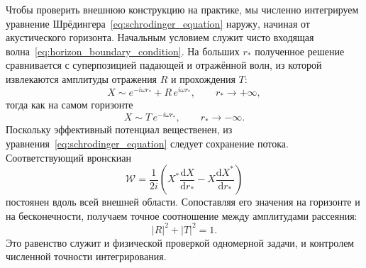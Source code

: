 \documentclass[12pt,a4paper,preprint,nopreprintline]{elsarticle}
\begin{document}
Чтобы проверить внешнюю конструкцию на практике, мы численно интегрируем уравнение Шрёдингера~\eqref{eq:schrodinger_equation} наружу, начиная от акустического горизонта. Начальным условием служит чисто входящая волна~\eqref{eq:horizon_boundary_condition}. На больших $r_{*}$ полученное решение сравнивается с суперпозицией падающей и отражённой волн, из которой извлекаются амплитуды отражения $R$ и прохождения $T$:
\begin{equation}
    X
    \sim
    e^{-i\omega r_{*}}
    +R\,e^{i\omega r_{*}},
    \qquad
    r_{*}\rightarrow+\infty,
    \label{eq:scattering_amplitudes}
\end{equation}
тогда как на самом горизонте
\begin{equation}
    X
    \sim
    T\,e^{-i\omega r_{*}},
    \qquad
    r_{*}\rightarrow-\infty.
    \label{eq:scattering_horizon_amplitude}
\end{equation}
Поскольку эффективный потенциал вещественен, из уравнения~\eqref{eq:schrodinger_equation} следует сохранение потока. Соответствующий вронскиан
\begin{equation}
    \mathcal{W}
    =
    \frac{1}{2i}
    \left(
        X^{*}\frac{\mathrm{d}X}{\mathrm{d}r_{*}}
        -
        X\frac{\mathrm{d}X^{*}}{\mathrm{d}r_{*}}
    \right)
    \label{eq:wronskian_flux}
\end{equation}
постоянен вдоль всей внешней области. Сопоставляя его значения на горизонте и на бесконечности, получаем точное соотношение между амплитудами рассеяния:
\begin{equation}
    |R|^{2}+|T|^{2}=1.
    \label{eq:flux_conservation}
\end{equation}
Это равенство служит и физической проверкой одномерной задачи, и контролем численной точности интегрирования.
\end{document}
